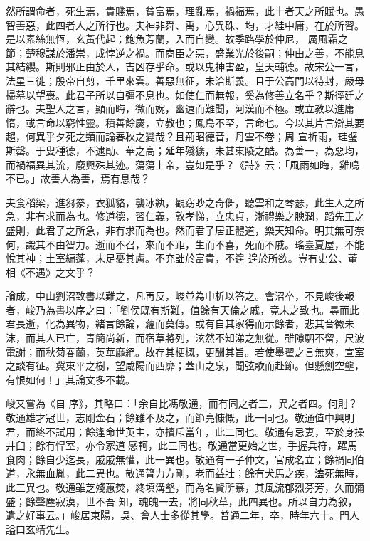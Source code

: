\begin{pinyinscope}
 然所謂命者，死生焉，貴賤焉，貧富焉，理亂焉，禍福焉，此十者天之所賦也。愚智善惡，此四者人之所行也。夫神非舜、禹，心異硃、均，才絓中庸，在於所習。是以素絲無恆，玄黃代起；鮑魚芳蘭，入而自變。故季路學於仲尼，
 厲風霜之節；楚穆謀於潘崇，成悖逆之禍。而商臣之惡，盛業光於後嗣；仲由之善，不能息其結纓。斯則邪正由於人，吉凶存乎命。或以鬼神害盈，皇天輔德。故宋公一言，法星三徙；殷帝自剪，千里來雲。善惡無征，未洽斯義。且于公高門以待封，嚴母掃墓以望喪。此君子所以自彊不息也。如使仁而無報，奚為修善立名乎？斯徑廷之辭也。夫聖人之言，顯而晦，微而婉，幽遠而難聞，河漢而不極。或立教以進庸惰，或言命以窮性靈。積善餘慶，立教也；鳳鳥不至，言命也。今以其片言辯其要趨，何異乎夕死之類而論春秋之變哉？且荊昭德音，丹雲不卷；周
 宣祈雨，珪璧斯罄。于叟種德，不逮勛、華之高；延年殘獷，未甚東陵之酷。為善一，為惡均，而禍福異其流，廢興殊其迹。蕩蕩上帝，豈如是乎？《詩》云：「風雨如晦，雞鳴不已。」故善人為善，焉有息哉？



 夫食稻梁，進芻豢，衣狐貉，襲冰紈，觀窈眇之奇儛，聽雲和之琴瑟，此生人之所急，非有求而為也。修道德，習仁義，敦孝悌，立忠貞，漸禮樂之腴潤，蹈先王之盛則，此君子之所急，非有求而為也。然而君子居正體道，樂天知命。明其無可奈何，識其不由智力。逝而不召，來而不距，生而不喜，死而不戚。瑤臺夏屋，不能悅其神；土室編蓬，未足憂其慮。不充詘於富貴，不遑
 遑於所欲。豈有史公、董相《不遇》之文乎？



 論成，中山劉沼致書以難之，凡再反，峻並為申析以答之。會沼卒，不見峻後報者，峻乃為書以序之曰：「劉侯既有斯難，值餘有天倫之戚，竟未之致也。尋而此君長逝，化為異物，緒言餘論，蘊而莫傳。或有自其家得而示餘者，悲其音徽未沫，而其人已亡，青簡尚新，而宿草將列，泫然不知涕之無從。雖隙駟不留，尺波電謝；而秋菊春蘭，英華靡絕。故存其梗概，更酬其旨。若使墨翟之言無爽，宣室之談有征。冀東平之樹，望咸陽而西靡；蓋山之泉，聞弦歌而赴節。但懸劍空壟，有恨如何！」其論文多不載。



 峻又嘗為《自
 序》，其略曰：「余自比馮敬通，而有同之者三，異之者四。何則？敬通雄才冠世，志剛金石；餘雖不及之，而節亮慷慨，此一同也。敬通值中興明君，而終不試用；餘逢命世英主，亦擯斥當年，此二同也。敬通有忌妻，至於身操井臼；餘有悍室，亦令家道感軻，此三同也。敬通當更始之世，手握兵符，躍馬食肉；餘自少迄長，戚戚無懽，此一異也。敬通有一子仲文，官成名立；餘禍同伯道，永無血胤，此二異也。敬通膂力方剛，老而益壯；餘有犬馬之疾，溘死無時，此三異也。敬通雖芝殘蕙焚，終填溝壑，而為名賢所慕，其風流郁烈芬芳，久而彌盛；餘聲塵寂漠，世不吾
 知，魂魄一去，將同秋草，此四異也。所以自力為敘，遺之好事云。」峻居東陽，吳、會人士多從其學。普通二年，卒，時年六十。門人謚曰玄靖先生。




\end{pinyinscope}
